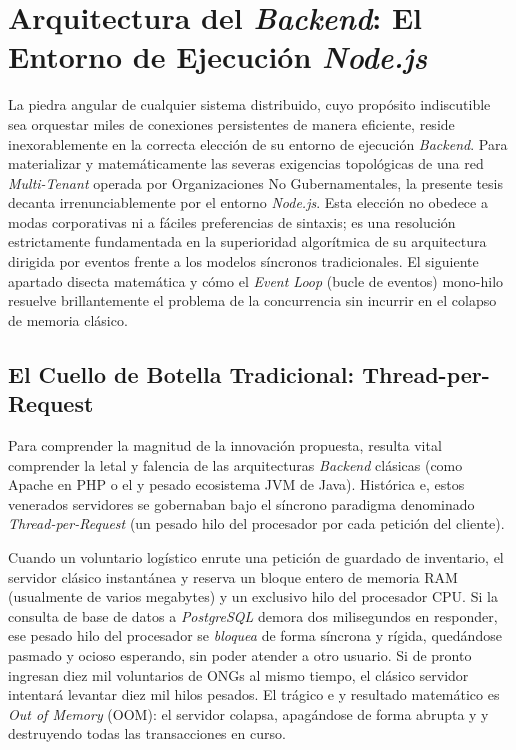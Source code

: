 \section{Arquitectura del \textit{Backend}: El Entorno de Ejecución \textit{Node.js}}

La piedra angular de cualquier sistema distribuido, cuyo propósito indiscutible sea orquestar miles de conexiones persistentes de manera eficiente, reside inexorablemente en la correcta elección de su entorno de ejecución \textit{Backend}. Para materializar y matemáticamente las severas exigencias topológicas de una red \textit{Multi-Tenant} operada por Organizaciones No Gubernamentales, la presente tesis decanta irrenunciablemente por el entorno \textit{Node.js}. Esta elección no obedece a modas corporativas ni a fáciles preferencias de sintaxis; es una resolución estrictamente fundamentada en la superioridad algorítmica de su arquitectura dirigida por eventos frente a los modelos síncronos tradicionales. El siguiente apartado disecta matemática y cómo el \textit{Event Loop} (bucle de eventos) mono-hilo resuelve brillantemente el problema de la concurrencia sin incurrir en el colapso de memoria clásico.

\subsection{El Cuello de Botella Tradicional: Thread-per-Request}

Para comprender la magnitud de la innovación propuesta, resulta vital comprender la letal y falencia de las arquitecturas \textit{Backend} clásicas (como Apache en PHP o el y pesado ecosistema JVM de Java). Histórica e, estos venerados servidores se gobernaban bajo el síncrono paradigma denominado \textit{Thread-per-Request} (un pesado hilo del procesador por cada petición del cliente). 

Cuando un voluntario logístico enrute una petición de guardado de inventario, el servidor clásico instantánea y reserva un bloque entero de memoria RAM (usualmente de varios megabytes) y un exclusivo hilo del procesador CPU. Si la consulta de base de datos a \textit{PostgreSQL} demora dos milisegundos en responder, ese pesado hilo del procesador se \textit{bloquea} de forma síncrona y rígida, quedándose pasmado y ocioso esperando, sin poder atender a otro usuario. Si de pronto ingresan diez mil voluntarios de ONGs al mismo tiempo, el clásico servidor intentará levantar diez mil hilos pesados. El trágico e y resultado matemático es \textit{Out of Memory} (OOM): el servidor colapsa, apagándose de forma abrupta y y destruyendo todas las transacciones en curso.


